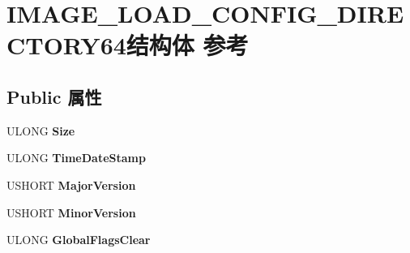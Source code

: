 \hypertarget{struct_i_m_a_g_e___l_o_a_d___c_o_n_f_i_g___d_i_r_e_c_t_o_r_y64}{}\section{I\+M\+A\+G\+E\+\_\+\+L\+O\+A\+D\+\_\+\+C\+O\+N\+F\+I\+G\+\_\+\+D\+I\+R\+E\+C\+T\+O\+R\+Y64结构体 参考}
\label{struct_i_m_a_g_e___l_o_a_d___c_o_n_f_i_g___d_i_r_e_c_t_o_r_y64}
\subsection*{Public 属性}
\begin{DoxyCompactItemize}
\item 
\mbox{\label{struct_i_m_a_g_e___l_o_a_d___c_o_n_f_i_g___d_i_r_e_c_t_o_r_y64_a367b78807f12fb5ee0f7261371a0bff5}} 
U\+L\+O\+NG {\bfseries Size}
\item 
\mbox{\label{struct_i_m_a_g_e___l_o_a_d___c_o_n_f_i_g___d_i_r_e_c_t_o_r_y64_a99b5ea468a35a2bb595e4c3e1cb6972d}} 
U\+L\+O\+NG {\bfseries Time\+Date\+Stamp}
\item 
\mbox{\label{struct_i_m_a_g_e___l_o_a_d___c_o_n_f_i_g___d_i_r_e_c_t_o_r_y64_aff12f4a27f6233d501f765f7082dbaf2}} 
U\+S\+H\+O\+RT {\bfseries Major\+Version}
\item 
\mbox{\label{struct_i_m_a_g_e___l_o_a_d___c_o_n_f_i_g___d_i_r_e_c_t_o_r_y64_aba409c5bee587c20c7bb49da8303a718}} 
U\+S\+H\+O\+RT {\bfseries Minor\+Version}
\item 
\mbox{\label{struct_i_m_a_g_e___l_o_a_d___c_o_n_f_i_g___d_i_r_e_c_t_o_r_y64_afcdd37d829bf5fdd79ed02749b0ae9af}} 
U\+L\+O\+NG {\bfseries Global\+Flags\+Clear}
\item 
\mbox{\label{struct_i_m_a_g_e___l_o_a_d___c_o_n_f_i_g___d_i_r_e_c_t_o_r_y64_ac58498c020ddee063e0245bf2a61ce4c}} 

\end{DoxyCompactItemize}
